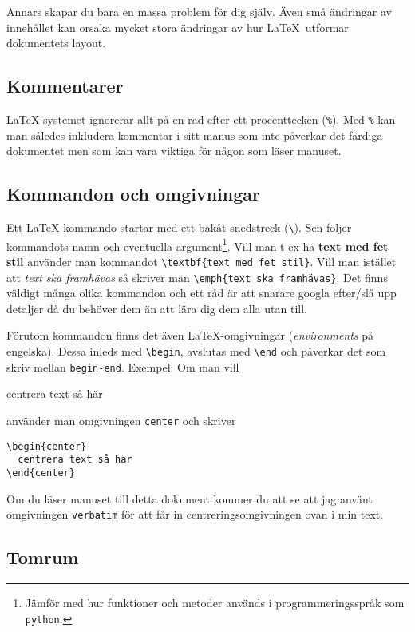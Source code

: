 \sqrt{}\documentclass[a4paper,12pt]{article}
\begin{document}
Annars skapar du bara en massa problem för dig själv. Även små
ändringar av innehållet kan orsaka mycket stora ändringar av hur
\LaTeX\ utformar dokumentets layout. 

\subsection{Kommentarer}

\LaTeX-systemet ignorerar allt på en rad efter ett procenttecken
(\verb!%!). Med \verb!%! kan man således inkludera kommentar i sitt
manus som inte påverkar det färdiga dokumentet men som kan vara
viktiga för någon som läser manuset.

\subsection{Kommandon och omgivningar}

Ett \LaTeX-kommando startar med ett bakåt-snedstreck (\verb!\!). Sen
följer kommandots namn och eventuella argument\footnote{Jämför med hur
funktioner och metoder används i programmeringsspråk som
\texttt{python}.}. Vill man t ex ha \textbf{text med fet stil}
använder man kommandot \label{sec:textbf}
\verb!\textbf{text med fet stil}!. Vill man istället att \emph{text 
ska framhävas} så skriver man \verb!\emph{text ska framhävas}!.
\label{sec:emph} Det finns väldigt många olika kommandon 
och ett råd är att snarare googla efter/slå upp detaljer då du behöver
dem än att lära dig dem alla utan till.  

Förutom kommandon finns det även \LaTeX-omgivningar
(\textit{environments} på engelska). Dessa inleds med \verb!\begin!,
  avslutas med \verb!\end! och påverkar det som skriv mellan
\texttt{begin-end}. Exempel: Om man vill 
%
\begin{center}
  centrera text så här
\end{center}
%
använder man omgivningen \texttt{center} och skriver
%
\begin{verbatim}
\begin{center}
  centrera text så här
\end{center}
\end{verbatim}
%
Om du läser manuset till detta dokument kommer du att se att jag
använt omgivningen \texttt{verbatim} för att får in
centreringsomgivningen ovan i min text.  

\subsection{Tomrum}
\end{document}
